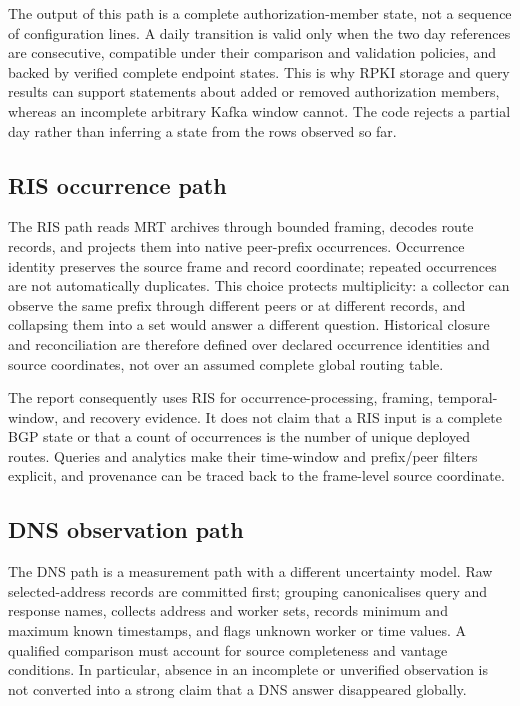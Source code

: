 \documentclass[a4paper,11pt]{article}
\begin{document}
The output of this path is a complete authorization-member state, not a sequence of configuration lines. A daily transition is valid only when the two day references are consecutive, compatible under their comparison and validation policies, and backed by verified complete endpoint states. This is why RPKI storage and query results can support statements about added or removed authorization members, whereas an incomplete arbitrary Kafka window cannot. The code rejects a partial day rather than inferring a state from the rows observed so far.

\subsection{RIS occurrence path}

The RIS path reads MRT archives through bounded framing, decodes route records, and projects them into native peer-prefix occurrences. Occurrence identity preserves the source frame and record coordinate; repeated occurrences are not automatically duplicates. This choice protects multiplicity: a collector can observe the same prefix through different peers or at different records, and collapsing them into a set would answer a different question. Historical closure and reconciliation are therefore defined over declared occurrence identities and source coordinates, not over an assumed complete global routing table.

The report consequently uses RIS for occurrence-processing, framing, temporal-window, and recovery evidence. It does not claim that a RIS input is a complete BGP state or that a count of occurrences is the number of unique deployed routes. Queries and analytics make their time-window and prefix/peer filters explicit, and provenance can be traced back to the frame-level source coordinate.

\subsection{DNS observation path}

The DNS path is a measurement path with a different uncertainty model. Raw selected-address records are committed first; grouping canonicalises query and response names, collects address and worker sets, records minimum and maximum known timestamps, and flags unknown worker or time values. A qualified comparison must account for source completeness and vantage conditions. In particular, absence in an incomplete or unverified observation is not converted into a strong claim that a DNS answer disappeared globally.
\end{document}
